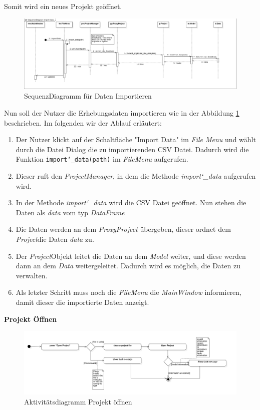 \documentclass{article}
\begin{document}
Somit wird ein neues Projekt geöffnet.
\begin{figure}[H]%
    \includegraphics[width=15cm]{entwurf/Entwurf_dokument/img/Alissa/SQImportDataFinal.png}
    \caption{SequenzDiagramm für Daten Importieren}
    \label{sq:importData}
\end{figure}
Nun soll der Nutzer die Erhebungsdaten importieren wie in der Abbildung \ref{sq:importData} beschrieben. Im folgenden wir der Ablauf erläutert:
\begin{enumerate}
    \item[1.] Der Nutzer klickt auf der Schaltfläche "Import Data" im \textit{File Menu} und wählt durch die Datei Dialog die zu importierenden CSV Datei. Dadurch wird die Funktion \texttt{import\char`_data(path)} im \textit{FileMenu} aufgerufen.
    \item[2.] Dieser ruft den \textit{ProjectManager}, in dem die Methode \textit{import\char`_data} aufgerufen wird.
    \item[3.] In der Methode \textit{import\char`_data} wird die CSV Datei geöffnet. Nun stehen die Daten als \textit{data} vom typ \textit{DataFrame}
    \item[4.] Die Daten werden an dem \textit{ProxyProject} übergeben, dieser ordnet dem \textit{Project}\textendash die Daten \textit{data} zu.
    \item[5.] Der \textit{Project}\textendash Objekt leitet die Daten an dem \textit{Model} weiter, und diese werden dann an dem \textit{Data} weitergeleitet. Dadurch wird es möglich, die Daten zu verwalten.
    \item[6.] Als letzter Schritt muss noch die \textit{FileMenu} die \textit{MainWindow} informieren, damit dieser die importierte Daten anzeigt. 
\end{enumerate}
\newpage
\textbf{\large{Projekt Öffnen}}
\begin{figure}[H]%
    \centering
    \includegraphics[width=13cm]{entwurf/Entwurf_dokument/img/Alissa/OpenProjectAD.png}
    \caption{Aktivitätsdiagramm Projekt öffnen}
\end{figure}
\end{document}
